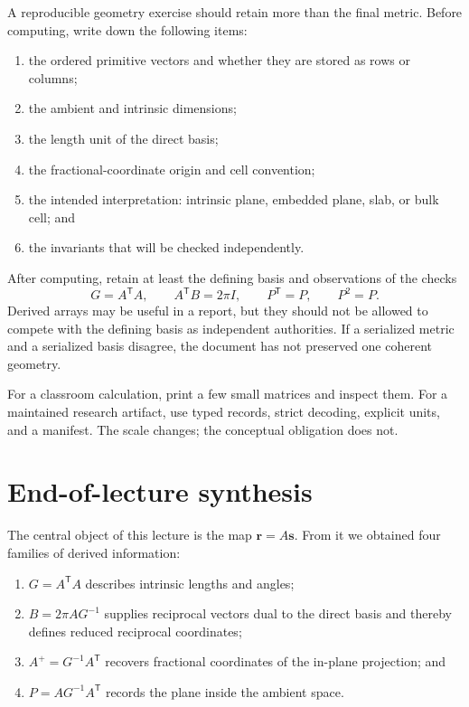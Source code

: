 A reproducible geometry exercise should retain more than the final metric.
Before computing, write down the following items:

\begin{enumerate}
  \item the ordered primitive vectors and whether they are stored as rows or
        columns;
  \item the ambient and intrinsic dimensions;
  \item the length unit of the direct basis;
  \item the fractional-coordinate origin and cell convention;
  \item the intended interpretation: intrinsic plane, embedded plane, slab, or
        bulk cell; and
  \item the invariants that will be checked independently.
\end{enumerate}

After computing, retain at least the defining basis and observations of the
checks
\begin{equation}
  G=A^{\mathsf T}A,
  \qquad
  A^{\mathsf T}B=2\pi I,
  \qquad
  P^{\mathsf T}=P,
  \qquad
  P^2=P.
  \label{eq:training-geometry-lab-checks}
\end{equation}
Derived arrays may be useful in a report, but they should not be allowed to
compete with the defining basis as independent authorities. If a serialized
metric and a serialized basis disagree, the document has not preserved one
coherent geometry.

For a classroom calculation, print a few small matrices and inspect them. For a
maintained research artifact, use typed records, strict decoding, explicit
units, and a manifest. The scale changes; the conceptual obligation does not.

\section{End-of-lecture synthesis}

The central object of this lecture is the map $\mathbf r=A\mathbf s$. From it we
obtained four families of derived information:

\begin{enumerate}
  \item $G=A^{\mathsf T}A$ describes intrinsic lengths and angles;
  \item $B=2\pi AG^{-1}$ supplies reciprocal vectors dual to the direct basis
        and thereby defines reduced reciprocal coordinates;
  \item $A^+=G^{-1}A^{\mathsf T}$ recovers fractional coordinates of the
        in-plane projection; and
  \item $P=AG^{-1}A^{\mathsf T}$ records the plane inside the ambient space.
\end{enumerate}

